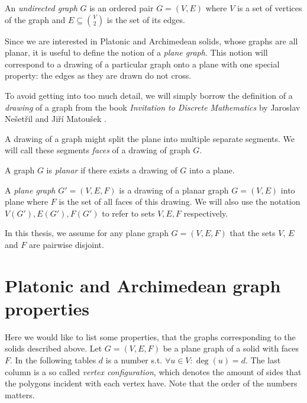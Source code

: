 \begin{definition}
    An \emph{undirected graph} $G$ is an ordered pair $G=(V,E)$ where $V$ is a set of vertices of the graph and $E \subseteq \binom{V}{2}$ is the set of its edges. 
\end{definition}

Since we are interested in Platonic and Archimedean solids, whose graphs are all planar, it is useful to define the notion of a \textit{plane graph}. This notion will correspond to a drawing of a particular graph onto a plane with one special property: the edges as they are drawn do not cross. 

\begin{highlight}
To avoid getting into too much detail, we will simply borrow the definition of a \textit{drawing} of a graph from the book \textit{Invitation to Discrete Mathematics} by Jaroslav Nešetřil and Jiří Matoušek \cite{matousek2009}.

\end{highlight}

A drawing of a graph might split the plane into multiple separate segments. We will call these segments \textit{faces} of a drawing of graph $G$.

\begin{definition}
    A graph $G$ is \emph{planar} if there exists a drawing of $G$ into a plane.
\end{definition}

\begin{definition}
    A \emph{plane graph} $G' = (V,E,F)$ is a drawing of a planar graph $G=(V,E)$ into plane where $F$ is the set of all faces of this drawing. We will also use the notation $V(G'), E(G'), F(G')$ to refer to sets $V,E,F$ respectively.
\end{definition}

In this thesis, we assume for any plane graph $G=(V,E,F)$ that the sets $V$, $E$ and $F$ are pairwise disjoint.


\section{Platonic and Archimedean graph properties}

\begin{highlight}
Here we would like to list some properties, that the graphs corresponding to the solids described above. Let $G=(V,E,F)$ be a plane graph of a solid with faces $F$. In the following tables $d$ is a number s.t. $\forall u \in V : \deg(u) = d$. The last column is a so called \textit{vertex configuration}, which denotes the amount of sides that the polygons incident with each vertex have. Note that the order of the numbers matters.
\end{highlight}

